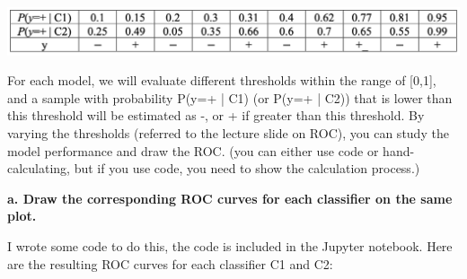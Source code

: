 \includegraphics[width=1\textwidth]{media/hw5_q2.png}

For each model, we will evaluate different thresholds within the range of [0,1], and a sample with probability P(y=+ | C1) (or P(y=+ | C2)) that is lower than this threshold will be estimated as -, or + if greater than this threshold. By varying the thresholds (referred to the lecture slide on ROC), you can study the model performance and draw the ROC. (you can either use code or hand-calculating, but if you use code, you need to show the calculation process.)

\textbf{a. Draw the corresponding ROC curves for each classifier on the same plot.}

I wrote some code to do this, the code is included in the Jupyter notebook. Here are the resulting ROC curves for each classifier C1 and C2:

